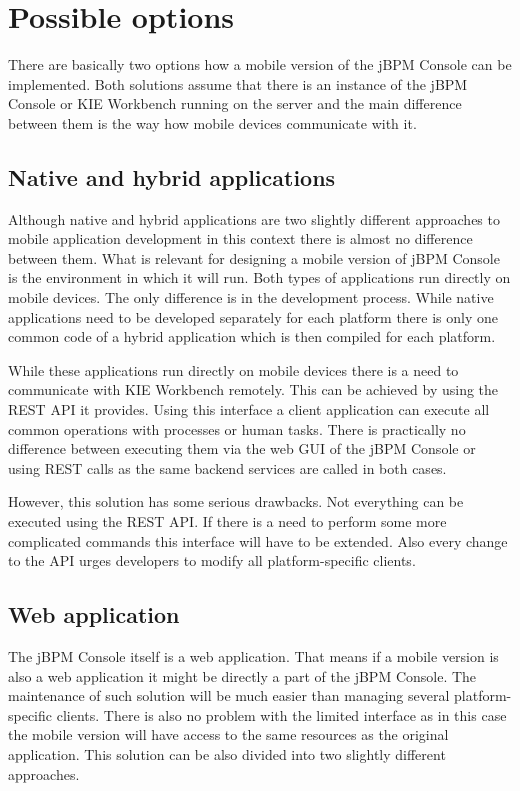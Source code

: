 \documentclass[12pt,oneside,final]{fithesis2}
\begin{document}
\section{Possible options}
There are basically two options how a mobile version of the jBPM Console can be implemented.
Both solutions assume that there is an instance of the jBPM Console or KIE Workbench running on the server and the main difference between them is the way how mobile devices communicate with it.

\subsection{Native and hybrid applications}
Although native and hybrid applications are two slightly different approaches to mobile application development in this context there is almost no difference between them.
What is relevant for designing a mobile version of jBPM Console is the environment in which it will run.
Both types of applications run directly on mobile devices.
The only difference is in the development process.
While native applications need to be developed separately for each platform there is only one common code of a hybrid application which is then compiled for each platform.

While these applications run directly on mobile devices there is a need to communicate with KIE Workbench remotely.
This can be achieved by using the REST\footnotemark{} API it provides.
Using this interface a client application can execute all common operations with processes or human tasks.
There is practically no difference between executing them via the web GUI of the jBPM Console or using REST calls as the same backend services are called in both cases.

However, this solution has some serious drawbacks.
Not everything can be executed using the REST API.
If there is a need to perform some more complicated commands this interface will have to be extended.
Also every change to the API urges developers to modify all platform-specific clients.

\subsection{Web application}
\label{sec:webapp}
The jBPM Console itself is a web application.
That means if a mobile version is also a web application it might be directly a part of the jBPM Console.
The maintenance of such solution will be much easier than managing several platform-specific clients.
There is also no problem with the limited interface as in this case the mobile version will have access to the same resources as the original application.
This solution can be also divided into two slightly different approaches.
\end{document}
